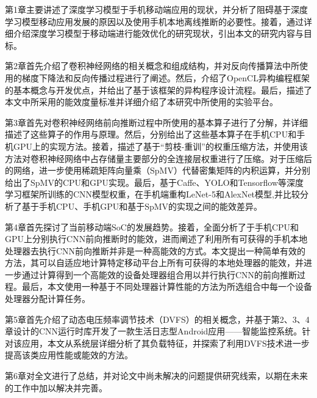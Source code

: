 第1章主要讲述了深度学习模型于手机移动端应用的现状，并分析了阻碍基于深度学习模型移动应用发展的原因以及使用手机本地离线推断的必要性。接着，通过详细介绍深度学习模型于移动端进行能效优化的研究现状，引出本文的研究内容与目标。

第2章首先介绍了卷积神经网络的相关概念和组成结构，并对反向传播算法中所使用的梯度下降法和反向传播过程进行了阐述。然后，介绍了OpenCL异构编程框架的基本概念与开发优点，并给出了基于该框架的异构程序设计流程。最后，描述了本文中所采用的能效度量标准并详细介绍了本研究中所使用的实验平台。

第3章首先对卷积神经网络前向推断过程中所使用的基本算子进行了分解，并详细描述了这些算子的作用与原理。然后，分别给出了这些基本算子在手机CPU和手机GPU上的实现方法。接着，描述了基于“剪枝-重训”的权重压缩方法，并使用该方法对卷积神经网络中占存储量主要部分的全连接层权重进行了压缩。对于压缩后的网络，进一步使用稀疏矩阵向量乘（SpMV）代替密集矩阵的内积运算，并分别给出了SpMV的CPU和GPU实现。最后，基于Caffe、YOLO和Tensorflow等深度学习框架所训练的CNN模型权重，在手机端重构LeNet-5\cite{lecun1998gradient}和AlexNet\cite{krizhevsky2012imagenet}模型,并比较分析了基于手机CPU、手机GPU和基于SpMV的实现之间的能效差异。

第4章首先探讨了当前移动端SoC的发展趋势。接着，全面分析了于手机CPU和GPU上分别执行CNN前向推断时的能效，进而阐述了利用所有可获得的手机本地处理器去执行CNN前向推断并非是一种高能效的方式。本文提出一种简单有效的方法，其可以自适应地计算特定移动平台上所有可获得的本地处理器的能效，并进一步通过计算得到一个高能效的设备处理器组合用以并行执行CNN的前向推断过程\cite{wang2017rethinking}。最后，本文使用一种基于不同处理器计算性能的方法为所选组合中每一个设备处理器分配计算任务。

第5章首先介绍了动态电压频率调节技术（DVFS）的相关概念，并基于第2、3、4章设计的CNN运行时库开发了一款生活日志型Android应用——智能监控系统。针对该应用，本文从系统层详细分析了其负载特征，并探索了利用DVFS技术进一步提高该类应用性能或能效的方法。

第6章对全文进行了总结，并对论文中尚未解决的问题提供研究线索，以期在未来的工作中加以解决并完善。

\cleardoublepage 